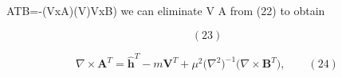 \documentclass{article}
\begin{document}
ATB=-(VxA)(V)VxB)
we can eliminate V  A from (22) to obtain


\begin{equation}
( 2 3 )
\end{equation}


\begin{equation}
\nabla \times \mathbf { A } ^ { T } = \mathbf { \hat { h } } ^ { T } - m \mathbf { V } ^ { T } + \mu ^ { 2 } \big ( \nabla ^ { 2 } \big ) ^ { - 1 } \big ( \nabla \times \mathbf { B } ^ { T } \big ) , \qquad ( 2 4 )
\end{equation}
\end{document}
